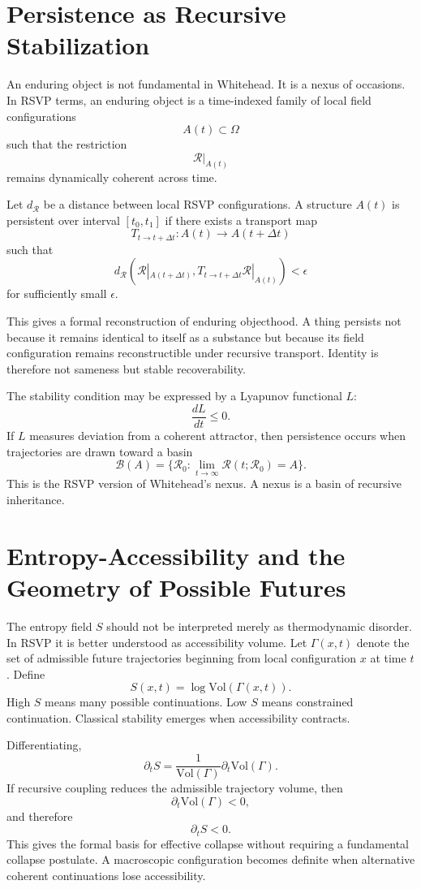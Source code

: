 \documentclass[12pt,a4paper]{article}
\begin{document}
\section{Persistence as Recursive Stabilization}

An enduring object is not fundamental in Whitehead. It is a nexus of occasions. In RSVP terms, an enduring object is a time-indexed family of local field configurations
\[
A(t) \subset \Omega
\]
such that the restriction
\[
\mathcal{R}|_{A(t)}
\]
remains dynamically coherent across time.

Let \(d_{\mathcal{R}}\) be a distance between local RSVP configurations. A structure \(A(t)\) is persistent over interval \([t_0,t_1]\) if there exists a transport map
\[
T_{t \to t+\Delta t}: A(t) \to A(t+\Delta t)
\]
such that
\[
d_{\mathcal{R}}\left(
\mathcal{R}|_{A(t+\Delta t)},
T_{t \to t+\Delta t}\mathcal{R}|_{A(t)}
\right)
< \epsilon
\]
for sufficiently small \(\epsilon\).

This gives a formal reconstruction of enduring objecthood. A thing persists not because it remains identical to itself as a substance but because its field configuration remains reconstructible under recursive transport. Identity is therefore not sameness but stable recoverability.

The stability condition may be expressed by a Lyapunov functional \(L\):
\[
\frac{dL}{dt} \leq 0.
\]
If \(L\) measures deviation from a coherent attractor, then persistence occurs when trajectories are drawn toward a basin
\[
\mathcal{B}(A)
=
\{\mathcal{R}_0 : \lim_{t\to\infty} \mathcal{R}(t;\mathcal{R}_0)=A\}.
\]
This is the RSVP version of Whitehead's nexus. A nexus is a basin of recursive inheritance.

\section{Entropy-Accessibility and the Geometry of Possible Futures}

The entropy field \(S\) should not be interpreted merely as thermodynamic disorder. In RSVP it is better understood as accessibility volume. Let \(\Gamma(x,t)\) denote the set of admissible future trajectories beginning from local configuration \(x\) at time \(t\). Define
\[
S(x,t) = \log \mathrm{Vol}(\Gamma(x,t)).
\]
High \(S\) means many possible continuations. Low \(S\) means constrained continuation. Classical stability emerges when accessibility contracts.

Differentiating,
\[
\partial_t S
=
\frac{1}{\mathrm{Vol}(\Gamma)}
\partial_t \mathrm{Vol}(\Gamma).
\]
If recursive coupling reduces the admissible trajectory volume, then
\[
\partial_t \mathrm{Vol}(\Gamma) < 0,
\]
and therefore
\[
\partial_t S < 0.
\]
This gives the formal basis for effective collapse without requiring a fundamental collapse postulate. A macroscopic configuration becomes definite when alternative coherent continuations lose accessibility.
\end{document}
